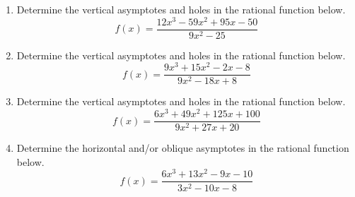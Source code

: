 \documentclass[14pt]{extbook}
\begin{document}
\begin{enumerate}
\item{
Determine the vertical asymptotes and holes in the rational function below.\[ f(x) = \frac{12x^{3} -59 x^{2} +95 x -50}{9x^{2} -25} \]} \newpage
\item{
Determine the vertical asymptotes and holes in the rational function below.\[ f(x) = \frac{9x^{3} +15 x^{2} -2 x -8}{9x^{2} -18 x + 8} \]} \newpage
\item{
Determine the vertical asymptotes and holes in the rational function below.\[ f(x) = \frac{6x^{3} +49 x^{2} +125 x + 100}{9x^{2} +27 x + 20} \]} \newpage
\item{
Determine the horizontal and/or oblique asymptotes in the rational function below.\[ f(x) = \frac{6x^{3} +13 x^{2} -9 x -10}{3x^{2} -10 x -8} \]} \newpage
\end{enumerate}
\end{document}
